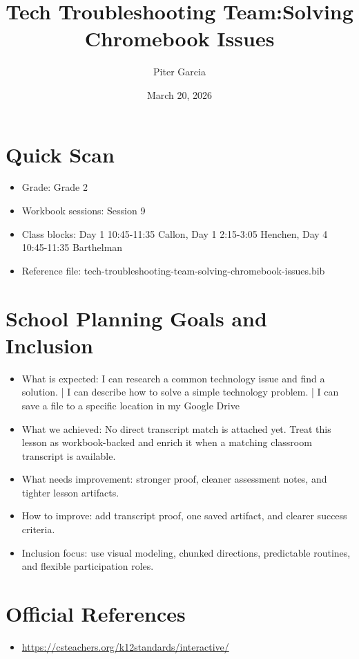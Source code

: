 \documentclass[11pt]{article}
\title{Tech Troubleshooting Team:Solving Chromebook Issues}
\author{Piter Garcia}
\date{March 20, 2026}
\begin{document}
\maketitle
\section*{Quick Scan}
\begin{itemize}[leftmargin=*]
\item Grade: Grade 2
\item Workbook sessions: Session 9
\item Class blocks: Day 1 10:45-11:35 Callon, Day 1 2:15-3:05 Henchen, Day 4 10:45-11:35 Barthelman
\item Reference file: tech-troubleshooting-team-solving-chromebook-issues.bib
\end{itemize}
\section*{School Planning Goals and Inclusion}
\begin{itemize}[leftmargin=*]
\item What is expected: I can research a common technology issue and find a solution. | I can describe how to solve a simple technology problem. | I can save a file to a specific location in my Google Drive
\item What we achieved: No direct transcript match is attached yet. Treat this lesson as workbook-backed and enrich it when a matching classroom transcript is available.
\item What needs improvement: stronger proof, cleaner assessment notes, and tighter lesson artifacts.
\item How to improve: add transcript proof, one saved artifact, and clearer success criteria.
\item Inclusion focus: use visual modeling, chunked directions, predictable routines, and flexible participation roles.
\end{itemize}
\section*{Official References}
\begin{itemize}[leftmargin=*]
\item \url{https://csteachers.org/k12standards/interactive/}

\end{itemize}
\end{document}
